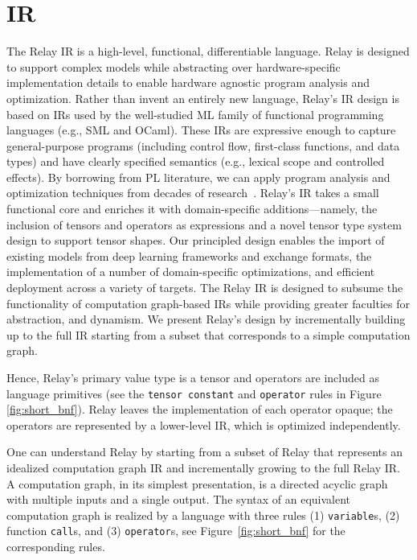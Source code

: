 \section{IR}



The Relay IR is a high-level, functional, differentiable language.
Relay is designed to support
  complex models while abstracting over hardware-specific
  implementation details to enable hardware agnostic program
  analysis and optimization.
Rather than invent an entirely new language,
  Relay's IR design is based on IRs used by the well-studied ML family of
  functional programming languages (e.g., SML and OCaml).
These IRs are expressive enough to capture general-purpose programs
  (including control flow, first-class functions, and data types)
  and have clearly specified semantics (e.g., lexical scope and controlled effects).
By borrowing from PL literature,
  we can apply program analysis and optimization techniques from decades of research~\citep{haskell_vector}.
Relay's IR takes a small functional core and enriches it with domain-specific additions---namely,
  the inclusion of tensors and operators as expressions
  and a novel tensor type system design to support tensor shapes.
Our principled design
  enables the import of existing models from deep learning frameworks and exchange formats,
  the implementation of a number of domain-specific optimizations,
  and efficient deployment across a variety of targets.
The Relay IR is designed
  to subsume the functionality of computation graph-based IRs
  while providing greater faculties for abstraction, and dynamism.
We present Relay's design by incrementally building up to the full IR
  starting from a subset that corresponds to a simple computation graph.

Hence, Relay's primary value type is a tensor and operators are included as language primitives
  (see the \verb|tensor constant| and \verb|operator| rules in Figure \ref{fig:short_bnf}).
Relay leaves the implementation of each operator opaque; the operators
  are represented by a lower-level IR, which is optimized independently.

One can understand Relay by starting from a subset of Relay
  that represents an idealized computation graph IR and
  incrementally growing to the full Relay IR.
A computation graph, in its simplest presentation, is a directed acyclic
  graph with multiple inputs and a single output.
The syntax of an equivalent computation graph is realized by
  a language with three rules (1) \verb|variable|s, (2) function \verb|call|s,
  and (3) \verb|operator|s, see Figure~\ref{fig:short_bnf} for the corresponding rules.

